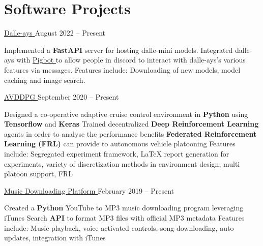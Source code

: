 \documentclass[a4paper,11pt]{article}
\newcommand{\github}{cboin1996} %
\begin{document}
\section{Software Projects}
\begin{subheading}
	\resumeProject
	{\href{https://github.com/cboin1996/dalle-ays}{Dalle-ays \footnotesize{\faExternalLink}}} %
	{August 2022 -- Present} %
	\begin{entries}
		\ib Implemented a \textbf{FastAPI} server for hosting dalle-mini models.
		\ib Integrated dalle-ays with \href{https://github.com/cboin1996/pigbot}{Pigbot \footnotesize{\faExternalLink}}
		to allow people in discord to interact with dalle-ays's various features via messages.
		\ib Features include: Downloading of new models, model caching and image search.

	\end{entries}
	\resumeProject
	{\href{https://github.com/\github/avddpg}{AVDDPG \footnotesize{\faExternalLink}}}
	{September 2020 -- Present} %
	\begin{entries}
		\ib Designed a co-operative adaptive cruise control environment in \textbf{Python} using \textbf{Tensorflow} and
		\textbf{Keras}
		\ib Trained decentralized \textbf{Deep Reinforcement Learning} agents in order to analyse the performance benefits \textbf{Federated Reinforcement Learning (FRL)}
		can provide to autonomous vehicle platooning
		\ib Features include: Segregated experiment framework, \LaTeX \hspace{0.5pt} report generation for experiments,
		variety of discretization methods in environment design, multi platoon support, FRL
	\end{entries}

	\resumeProject
	{\href{https://github.com/cboin1996/JukeBox}{Music Downloading Platform \footnotesize{\faExternalLink}}} %
	{February 2019 -- Present} %
	\begin{entries}
		\ib Created a \textbf{Python} YouTube to MP3 music downloading program leveraging iTunes Search \textbf{API} to format
		MP3 files with official MP3 metadata
		\ib Features include: Music playback, voice activated controls, song downloading, auto updates,
		integration with iTunes
	\end{entries}


\end{subheading}
\sectionsep
\end{document}
